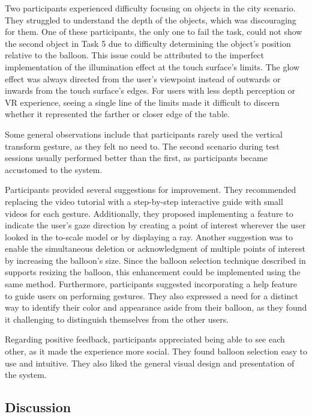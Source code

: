         Two participants experienced difficulty focusing on objects in the city scenario. They struggled to understand the depth of the objects, which was discouraging for them. One of these participants, the only one to fail the task, could not show the second object in Task 5 due to difficulty determining the object's position relative to the balloon. This issue could be attributed to the imperfect implementation of the illumination effect at the touch surface's limits. The glow effect was always directed from the user's viewpoint instead of outwards or inwards from the touch surface's edges. For users with less depth perception or VR experience, seeing a single line of the limits made it difficult to discern whether it represented the farther or closer edge of the table. 

        Some general observations include that participants rarely used the vertical transform gesture, as they felt no need to. The second scenario during test sessions usually performed better than the first, as participants became accustomed to the system.

        Participants provided several suggestions for improvement. They recommended replacing the video tutorial with a step-by-step interactive guide with small videos for each gesture. Additionally, they proposed implementing a feature to indicate the user's gaze direction by creating a point of interest wherever the user looked in the to-scale model or by displaying a ray. Another suggestion was to enable the simultaneous deletion or acknowledgment of multiple points of interest by increasing the balloon's size. Since the balloon selection technique described in \cite{benkoBalloonSelectionMultiFinger2007} supports resizing the balloon, this enhancement could be implemented using the same method. Furthermore, participants suggested incorporating a help feature to guide users on performing gestures. They also expressed a need for a distinct way to identify their color and appearance aside from their balloon, as they found it challenging to distinguish themselves from the other users.

        Regarding positive feedback, participants appreciated being able to see each other, as it made the experience more social. They found balloon selection easy to use and intuitive. They also liked the general visual design and presentation of the system.

    \subsection{Discussion}

